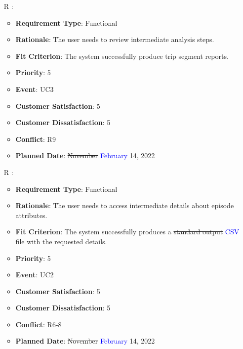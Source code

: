 \documentclass[12pt, titlepage]{article}
\newcounter{reqnum} %
\begin{document}
\begin{itemize}
\item[R\refstepcounter{reqnum}\thereqnum
\label{R_Inputs_1}:] 
\begin{itemize}
    \item \textbf{Requirement Type}: Functional
    \item \textbf{Rationale}: The user needs to review intermediate analysis steps. 
    \item \textbf{Fit Criterion}: The system successfully produce trip segment reports. 
    \item \textbf{Priority}: 5
    \item \textbf{Event}: UC3
    \item \textbf{Customer Satisfaction}: 5
    \item \textbf{Customer Dissatisfaction}: 5
    \item \textbf{Conflict}: R9
    \item \textbf{Planned Date}: \sout{November} \textcolor{blue}{February} 14, 2022
\end{itemize}

\item[R\refstepcounter{reqnum}\thereqnum
\label{R_Inputs_1}:] 
\begin{itemize}
    \item \textbf{Requirement Type}: Functional
    \item \textbf{Rationale}: The user needs to access intermediate details about episode attributes.
    \item \textbf{Fit Criterion}: The system successfully produces a \sout{standard output} \textcolor{blue}{CSV} file with the requested details.
    \item \textbf{Priority}: 5
    \item \textbf{Event}: UC2
    \item \textbf{Customer Satisfaction}: 5
    \item \textbf{Customer Dissatisfaction}: 5
    \item \textbf{Conflict}: R6-8
    \item \textbf{Planned Date}: \sout{November} \textcolor{blue}{February} 14, 2022
\end{itemize}

\end{itemize}
\end{document}
